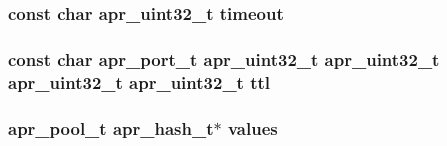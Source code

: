 \subsubsection[{\texorpdfstring{timeout}{timeout}}]{\setlength{\rightskip}{0pt plus 5cm}const char {\bf apr\+\_\+uint32\+\_\+t} timeout}\hypertarget{group__APR__Util__RC_ga48b7aa88e5841c0fe69f7d9a88646af3}{}\label{group__APR__Util__RC_ga48b7aa88e5841c0fe69f7d9a88646af3}
\subsubsection[{\texorpdfstring{ttl}{ttl}}]{\setlength{\rightskip}{0pt plus 5cm}const char {\bf apr\+\_\+port\+\_\+t} {\bf apr\+\_\+uint32\+\_\+t} {\bf apr\+\_\+uint32\+\_\+t} {\bf apr\+\_\+uint32\+\_\+t} {\bf apr\+\_\+uint32\+\_\+t} ttl}\hypertarget{group__APR__Util__RC_ga6e9eb567b7ddf19610db54e8c46cf78b}{}\label{group__APR__Util__RC_ga6e9eb567b7ddf19610db54e8c46cf78b}
\subsubsection[{\texorpdfstring{values}{values}}]{ {\bf apr\+\_\+pool\+\_\+t} {\bf apr\+\_\+hash\+\_\+t}$\ast$ values}\hypertarget{group__APR__Util__RC_ga4f3aba886fed854e787b8e8b1b7f6841}{}\label{group__APR__Util__RC_ga4f3aba886fed854e787b8e8b1b7f6841}

